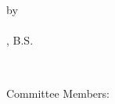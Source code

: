 \doublespacing
\begin{titlepage}
%
\begin{center}
    \begingroup
    \myTITLE \\
    \endgroup
    \\[0.5in] %
    by \\
    \\[0.5in] %
    \myName, B.S. \\

    \vfill

    \mySubtitle
    \myDegree \\

    \myTime
\end{center}
\vfill
Committee Members: \\
\indent\indent\indent\myCommitteeOne \\
\indent\indent\indent\myCommitteeTwo \\
\indent\indent\indent\myCommitteeThree \\
%
\end{titlepage}   
